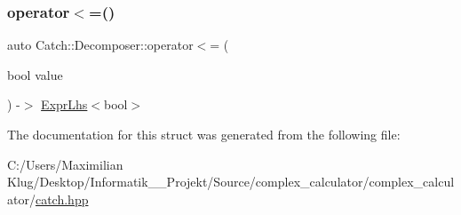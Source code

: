 \mbox{\label{struct_catch_1_1_decomposer_aac129b94903ae1339d5709049d83613b}} 
\subsubsection{\texorpdfstring{operator$<$=()}{operator<=()}\hspace{0.1cm}{\footnotesize\ttfamily [2/2]}}
{\footnotesize\ttfamily auto Catch\+::\+Decomposer\+::operator$<$= (\begin{DoxyParamCaption}\item[{bool}]{value }\end{DoxyParamCaption}) -\/$>$ \mbox{\hyperlink{class_catch_1_1_expr_lhs}{Expr\+Lhs}}$<$bool$>$ \hspace{0.3cm}{\ttfamily [inline]}}



The documentation for this struct was generated from the following file\+:\begin{DoxyCompactItemize}
\item 
C\+:/\+Users/\+Maximilian Klug/\+Desktop/\+Informatik\+\_\+\_\+\+Projekt/\+Source/complex\+\_\+calculator/complex\+\_\+calculator/\mbox{\hyperlink{catch_8hpp}{catch.\+hpp}}\end{DoxyCompactItemize}
